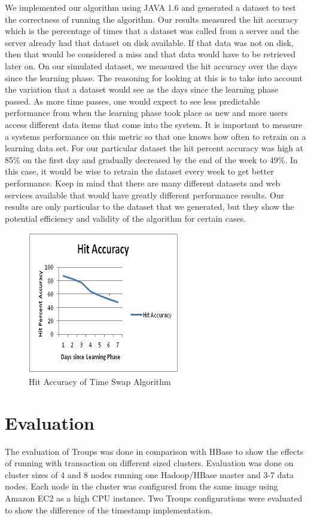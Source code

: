 \documentclass[10pt,final,journal]{IEEEtran}
\begin{document}
We implemented our algorithm using JAVA 1.6 and generated a dataset to test the correctness of running the algorithm. Our results measured the hit accuracy which is the percentage of times that a dataset was called from a server and the server already had that dataset on disk available. If that data was not on disk, then that would be considered a miss and that data would have to be retrieved later on. On our simulated dataset, we measured the hit accuracy over the days since the learning phase. The reasoning for looking at this is to take into account the variation that a dataset would see as the days since the learning phase passed. As more time passes, one would expect to see less predictable performance from when the learning phase took place as new and more users access different data items that come into the system. It is important to measure a systems performance on this metric so that one knows how often to retrain on a learning data set. For our particular dataset the hit percent accuracy was high at 85\% on the first day and gradually decreased by the end of the week to 49\%. In this case, it would be wise to retrain the dataset every week to get better performance. Keep in mind that there are many different datasets and web services available that would have greatly different performance results. Our results are only particular to the dataset that we generated, but they show the potential efficiency and validity of the algorithm for certain cases.

\begin{figure}[!t]
\centering
\hspace*{-.2in}
\includegraphics{images/hitaccuracy.png}
\caption{Hit Accuracy of Time Swap Algorithm}
\label{ts}
\end{figure}

\section{Evaluation}
The evaluation of Troups was done in comparison with HBase to show the effects of running with transaction on different sized clusters.  Evaluation was done on cluster sizes of 4 and 8 nodes running one Hadoop/HBase master and 3-7 data nodes.  Each node in the cluster was configured from the same image using Amazon EC2 as a high CPU instance.  Two Troups configurations were evaluated to show the difference of the timestamp implementation.
\end{document}
